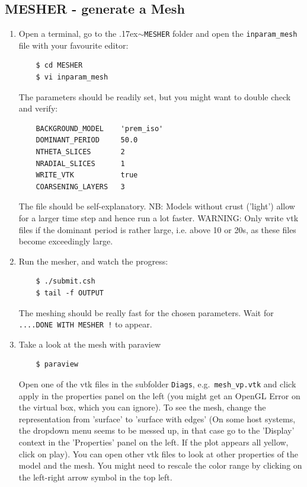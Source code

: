 \documentclass{article}
\newcommand{\ttilde}[0]{\raise.17ex\hbox{$\scriptstyle\sim$}}
\begin{document}
\subsection{MESHER - generate a Mesh}

\begin{enumerate}
    \item Open a terminal, go to the \ttilde\verb|MESHER| folder and open
    the \verb|inparam_mesh| file with your favourite editor:
    \begin{verbatim}
    $ cd MESHER
    $ vi inparam_mesh
    \end{verbatim}
    The parameters should be readily set, but you might want to double check and verify:
    \begin{verbatim}
    BACKGROUND_MODEL    'prem_iso'
    DOMINANT_PERIOD     50.0
    NTHETA_SLICES       2
    NRADIAL_SLICES      1 
    WRITE_VTK           true
    COARSENING_LAYERS   3
    \end{verbatim}
    The file should be self-explanatory. NB: Models without crust ('light') allow for a
    larger time step and hence run a lot faster. WARNING: Only write
    vtk files if the dominant period is rather large, i.e. above 10 or
    20s, as these files become exceedingly large.

    \item Run the mesher, and watch the progress:
    \begin{verbatim}
    $ ./submit.csh
    $ tail -f OUTPUT
    \end{verbatim}
    The meshing should be really fast for the chosen parameters. Wait for 
    \verb|....DONE WITH MESHER !| to appear.

    \item Take a look at the mesh with paraview
    \begin{verbatim}
    $ paraview
    \end{verbatim}
    Open one of the vtk files in the subfolder \verb|Diags|, e.g.\
    \verb|mesh_vp.vtk| and click apply in the properties panel on the left (you
    might get an OpenGL Error on the virtual box, which you can ignore). To see
    the mesh, change the representation from 'surface' to 'surface with edges'
    (On some host systems, the dropdown menu seems to be messed up, in that
    case go to the 'Display' context in the 'Properties' panel on the left. If
    the plot appears all yellow, click on play).  You can open other vtk files
    to look at other properties of the model and the mesh. You might need to
    rescale the color range by clicking on the left-right arrow symbol in the
    top left.


\end{enumerate}
\end{document}
